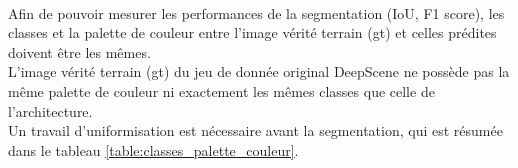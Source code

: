 ﻿
\vspace{\baselineskip}
\\
\noindent Afin de pouvoir mesurer les performances de la segmentation (IoU, F1 score), les classes et la palette de couleur entre l'image vérité terrain (\acrshort{gt}) et celles prédites doivent être les mêmes.
\vspace{\baselineskip}
\\
\noindent L'image vérité terrain (\acrshort{gt}) du jeu de donnée original DeepScene ne possède pas la même palette de couleur ni exactement les mêmes classes que celle de l'architecture.
\vspace{\baselineskip}
\\
\noindent Un travail d'uniformisation est nécessaire avant la segmentation, qui est résumée dans le tableau \ref{table:classes_palette_couleur}.
